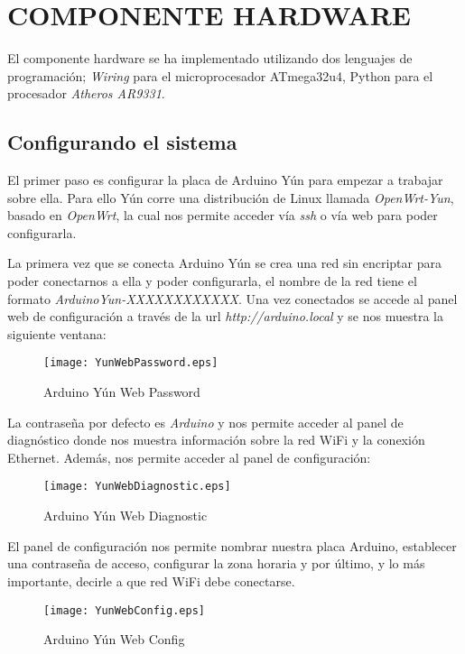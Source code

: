 \section{COMPONENTE HARDWARE}

El componente hardware se ha implementado utilizando dos lenguajes de programación; \emph{Wiring} para el microprocesador ATmega32u4, Python para el procesador \emph{Atheros AR9331}.

\subsection{Configurando el sistema}

El primer paso es configurar la placa de Arduino Yún para empezar a trabajar sobre ella. Para ello Yún corre una distribución de Linux llamada \emph{OpenWrt-Yun}, basado en \emph{OpenWrt}, la cual nos permite acceder vía \emph{ssh} o vía web para poder configurarla.

La primera vez que se conecta Arduino Yún se crea una red sin encriptar para poder conectarnos a ella y poder configurarla, el nombre de la red tiene el formato \emph{ArduinoYun-XXXXXXXXXXXX}. Una vez conectados se accede al panel web de configuración a través de la url \emph{http://arduino.local} y se nos muestra la siguiente ventana:

\begin{figure}[H]
    \centering
    \texttt{[image: YunWebPassword.eps]}
    \caption{Arduino Yún Web Password}\label{fig:yun-web-password}
\end{figure}

La contraseña por defecto es \emph{Arduino} y nos permite acceder al panel de diagnóstico donde nos muestra información sobre la red WiFi y la conexión Ethernet. Además, nos permite acceder al panel de configuración:

\begin{figure}[H]
    \centering
    \texttt{[image: YunWebDiagnostic.eps]}
    \caption{Arduino Yún Web Diagnostic}\label{fig:yun-web-diagnostic}
\end{figure}

El panel de configuración nos permite nombrar nuestra placa Arduino, establecer una contraseña de acceso, configurar la zona horaria y por último, y lo más importante, decirle a que red WiFi debe conectarse.

\begin{figure}[H]
    \centering
    \texttt{[image: YunWebConfig.eps]}
    \caption{Arduino Yún Web Config}\label{fig:yun-web-config}
\end{figure}

